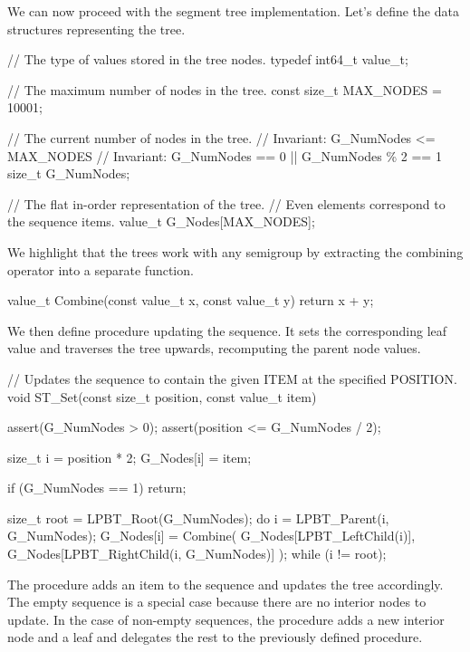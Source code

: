 \documentclass{article}
\begin{document}
We can now proceed with the segment tree implementation.
Let's define the data structures representing the tree.

\begin{code}[c]
// The type of values stored in the tree nodes.
typedef int64_t value_t;

// The maximum number of nodes in the tree.
const size_t MAX_NODES = 10001;

// The current number of nodes in the tree.
// Invariant: G_NumNodes <= MAX_NODES
// Invariant: G_NumNodes == 0 || G_NumNodes \% 2 == 1
size_t G_NumNodes;

// The flat in-order representation of the tree.
// Even elements correspond to the sequence items.
value_t G_Nodes[MAX_NODES];
\end{code}

We highlight that the trees work with any semigroup by extracting the combining operator into a separate function.

\begin{code}[c]
value_t Combine(const value_t x, const value_t y) {
    return x + y;
}
\end{code}

We then define procedure  updating the sequence.
It sets the corresponding leaf value and traverses the tree upwards, recomputing the parent node values.

\begin{code}[c]
// Updates the sequence to contain the given ITEM at the specified POSITION.
void ST_Set(const size_t position, const value_t item) {
    assert(G_NumNodes > 0);
    assert(position <= G_NumNodes / 2);

    size_t i = position * 2;
    G_Nodes[i] = item;

    if (G_NumNodes == 1) return;

    size_t root = LPBT_Root(G_NumNodes);
    do {
        i = LPBT_Parent(i, G_NumNodes);
        G_Nodes[i] = Combine(
            G_Nodes[LPBT_LeftChild(i)],
            G_Nodes[LPBT_RightChild(i, G_NumNodes)]
        );
    } while (i != root);
}
\end{code}

The  procedure adds an item to the sequence and updates the tree accordingly.
The empty sequence is a special case because there are no interior nodes to update.
In the case of non-empty sequences, the procedure adds a new interior node and a leaf and delegates the rest to the previously defined  procedure.
\end{document}
